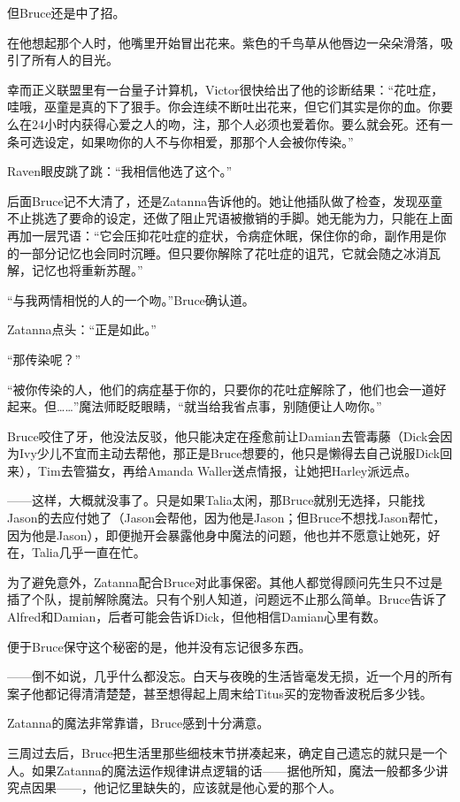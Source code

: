 \documentclass[../main.tex]{subfiles}
\begin{document}
但Bruce还是中了招。

在他想起那个人时，他嘴里开始冒出花来。紫色的千鸟草从他唇边一朵朵滑落，吸引了所有人的目光。

幸而正义联盟里有一台量子计算机，Victor很快给出了他的诊断结果：“花吐症，哇哦，巫童是真的下了狠手。你会连续不断吐出花来，但它们其实是你的血。你要么在24小时内获得心爱之人的吻，注，那个人必须也爱着你。要么就会死。还有一条可选设定，如果吻你的人不与你相爱，那那个人会被你传染。”

Raven眼皮跳了跳：“我相信他选了这个。”

后面Bruce记不大清了，还是Zatanna告诉他的。她让他插队做了检查，发现巫童不止挑选了要命的设定，还做了阻止咒语被撤销的手脚。她无能为力，只能在上面再加一层咒语：“它会压抑花吐症的症状，令病症休眠，保住你的命，副作用是你的一部分记忆也会同时沉睡。但只要你解除了花吐症的诅咒，它就会随之冰消瓦解，记忆也将重新苏醒。”

“与我两情相悦的人的一个吻。”Bruce确认道。

Zatanna点头：“正是如此。”

“那传染呢？”

“被你传染的人，他们的病症基于你的，只要你的花吐症解除了，他们也会一道好起来。但\ldots\ldots”魔法师眨眨眼睛，“就当给我省点事，别随便让人吻你。”

Bruce咬住了牙，他没法反驳，他只能决定在痊愈前让Damian去管毒藤（Dick会因为Ivy少儿不宜而主动去帮他，那正是Bruce想要的，他只是懒得去自己说服Dick回来），Tim去管猫女，再给Amanda
Waller送点情报，让她把Harley派远点。

——这样，大概就没事了。只是如果Talia太闲，那Bruce就别无选择，只能找Jason的去应付她了（Jason会帮他，因为他是Jason；但Bruce不想找Jason帮忙，因为他是Jason），即便抛开会暴露他身中魔法的问题，他也并不愿意让她死，好在，Talia几乎一直在忙。

为了避免意外，Zatanna配合Bruce对此事保密。其他人都觉得顾问先生只不过是插了个队，提前解除魔法。只有个别人知道，问题远不止那么简单。Bruce告诉了Alfred和Damian，后者可能会告诉Dick，但他相信Damian心里有数。

便于Bruce保守这个秘密的是，他并没有忘记很多东西。

——倒不如说，几乎什么都没忘。白天与夜晚的生活皆毫发无损，近一个月的所有案子他都记得清清楚楚，甚至想得起上周末给Titus买的宠物香波税后多少钱。

Zatanna的魔法非常靠谱，Bruce感到十分满意。

三周过去后，Bruce把生活里那些细枝末节拼凑起来，确定自己遗忘的就只是一个人。如果Zatanna的魔法运作规律讲点逻辑的话——据他所知，魔法一般都多少讲究点因果——，他记忆里缺失的，应该就是他心爱的那个人。
\end{document}

